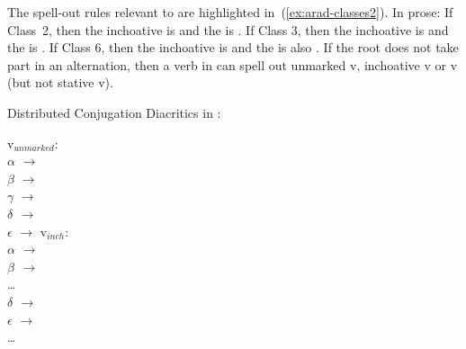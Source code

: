 \begin{exe}
\begin{xlist}
\begin{xlist}
\begin{exe}
\begin{exe}
\begin{xlist}
\begin{exe}
\begin{xlist}
\begin{exe}
\begin{xlist}
\begin{xlist}
\begin{exe}
\begin{xlist}
\begin{exe}
\begin{xlist}
\begin{exe}
\begin{xlist}
\begin{exe}
\begin{exe}
\begin{exe}
\begin{xlist}
\begin{exe}
\begin{exe}
\begin{xlist}
\begin{xlist}
\begin{exe}
\begin{xlist}
\begin{exe}
\begin{exe}
\begin{xlist}
\begin{exe}
\begin{exe}
\begin{xlist}
\begin{exe}
\begin{xlist}
\begin{exe}
\begin{xlist}
\begin{exe}
\begin{xlist}
\begin{exe}
\begin{exe}
\begin{xlist}
\begin{exe}
\begin{exe}
\begin{xlist}
\begin{xlist}
\begin{exe}
\begin{xlist}
\begin{xlist}
\begin{exe}
\begin{xlist}
\begin{exe}
\begin{xlist}
\begin{exe}
\begin{xlist}
\begin{exe}
\begin{xlist}
\begin{exe}
\begin{exe}
\begin{exe}
\begin{exe}
\begin{xlist}
\begin{exe}
\begin{exe}
\begin{xlist}
\begin{xlist}
\begin{exe}
\begin{exe}
\begin{xlist}
The spell-out rules relevant to {\thif} are highlighted in~(\ref{ex:arad-classes2}). In prose: If Class~2, then the inchoative is {\tkal} and the  is {\thif}. If Class 3, then the inchoative is {\tnif} and the  is {\thif}. If Class 6, then the inchoative is {\thif} and the  is also {\thif}. If the root does not take part in an alternation, then a verb in {\thif} can spell out unmarked v, inchoative v or  v (but not stative v).
 \begin{exe}
 \ex  Distributed Conjugation Diacritics in \citet[230]{arad05}: \label{ex:arad-classes2} 
 \begin{xlist} 
\begin{multicols}{2}
 	\ex   v$_{unmarked}$: \\
			$ \alpha$ $\rightarrow$ {\tkal} \\
			$\beta$ $\rightarrow$ {\tnif}\\
			$\gamma$ $\rightarrow$ {\tpie}\\
			\textbf{$\delta$ $\rightarrow$ {\thif}}\\
			$\epsilon$ $\rightarrow$ {\thit}
 	\ex  v$_{inch}$: \\
			$ \alpha$ $\rightarrow$ {\tkal} \\
			\textbf{$\beta$ $\rightarrow$ {\tnif}} \\
			\dots \\
			\textbf{$\delta$ $\rightarrow$ {\thif}}\\
			$\epsilon$ $\rightarrow$ {\thit}\\
			\dots \\

\end{multicols}
\end{xlist}
\end{exe}
\end{xlist}
\end{exe}
\end{exe}
\end{xlist}
\end{xlist}
\end{exe}
\end{exe}
\end{xlist}
\end{exe}
\end{exe}
\end{exe}
\end{exe}
\end{xlist}
\end{exe}
\end{xlist}
\end{exe}
\end{xlist}
\end{exe}
\end{xlist}
\end{exe}
\end{xlist}
\end{xlist}
\end{exe}
\end{xlist}
\end{xlist}
\end{exe}
\end{exe}
\end{xlist}
\end{exe}
\end{exe}
\end{xlist}
\end{exe}
\end{xlist}
\end{exe}
\end{xlist}
\end{exe}
\end{xlist}
\end{exe}
\end{exe}
\end{xlist}
\end{exe}
\end{exe}
\end{xlist}
\end{exe}
\end{xlist}
\end{xlist}
\end{exe}
\end{exe}
\end{xlist}
\end{exe}
\end{exe}
\end{exe}
\end{xlist}
\end{exe}
\end{xlist}
\end{exe}
\end{xlist}
\end{exe}
\end{xlist}
\end{xlist}
\end{exe}
\end{xlist}
\end{exe}
\end{xlist}
\end{exe}
\end{exe}
\end{xlist}
\end{xlist}
\end{exe}
